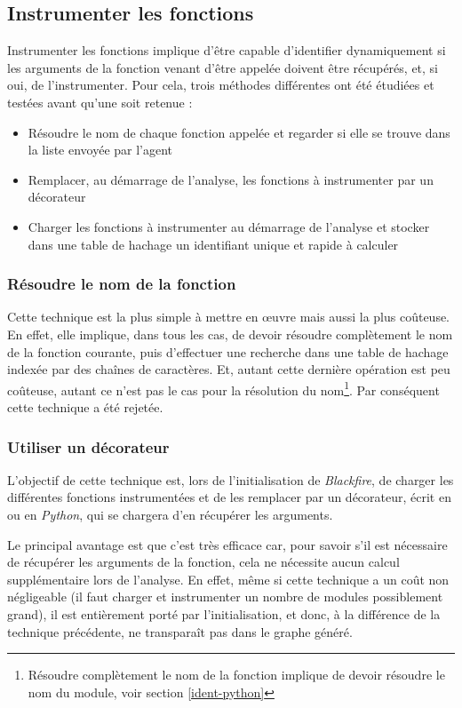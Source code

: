 \subsection{Instrumenter les fonctions}
Instrumenter les fonctions implique d'être capable d'identifier dynamiquement si les arguments de la fonction venant d'être appelée doivent être récupérés, et, si oui, de l'instrumenter. Pour cela, trois méthodes différentes ont été étudiées et testées avant qu'une soit retenue : 
\begin{itemize}
\item Résoudre le nom de chaque fonction appelée et regarder si elle se trouve dans la liste envoyée par l'agent
\item Remplacer, au démarrage de l'analyse, les fonctions à instrumenter par un décorateur
\item Charger les fonctions à instrumenter au démarrage de l'analyse et stocker dans une table de hachage un identifiant unique et rapide à calculer
\end{itemize}

\subsubsection*{Résoudre le nom de la fonction}
Cette technique est la plus simple à mettre en œuvre mais aussi la plus coûteuse. En effet, elle implique, dans tous les cas, de devoir résoudre complètement le nom de la fonction courante, puis d'effectuer une recherche dans une table de hachage indexée par des chaînes de caractères. Et, autant cette dernière opération est peu coûteuse, autant ce n'est pas le cas pour la résolution du nom\footnote{Résoudre complètement le nom de la fonction implique de devoir résoudre le nom du module, voir section \vref{ident-python}}. Par conséquent cette technique a été rejetée.

\subsubsection*{Utiliser un décorateur}
L'objectif de cette technique est, lors de l'initialisation de \emph{Blackfire}, de charger les différentes fonctions instrumentées et de les remplacer par un décorateur, écrit en \C ou en \emph{Python}, qui se chargera d'en récupérer les arguments.

Le principal avantage est que c'est très efficace car, pour savoir s'il est nécessaire de récupérer les arguments de la fonction, cela ne nécessite aucun calcul supplémentaire lors de l'analyse. En effet, même si cette technique a un coût non négligeable (il faut charger et instrumenter un nombre de modules possiblement grand), il est entièrement porté par l'initialisation, et donc, à la différence de la technique précédente, ne transparaît pas dans le graphe généré.

